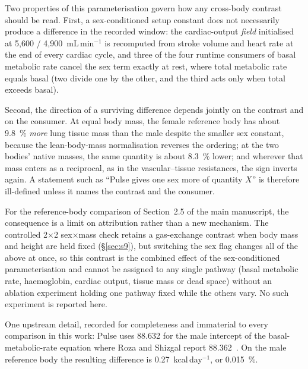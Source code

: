 \documentclass[pdflatex,sn-nature]{sn-jnl}%
\newcommand{\mainref}[2]{#2}
\begin{document}
Two properties of this parameterisation govern how any cross-body contrast should be read. First, a sex-conditioned setup constant does not necessarily produce a difference in the recorded window: the cardiac-output \emph{field} initialised at 5{,}600 / 4{,}900~mL\,min$^{-1}$ is recomputed from stroke volume and heart rate at the end of every cardiac cycle, and three of the four runtime consumers of basal metabolic rate cancel the sex term exactly at rest, where total metabolic rate equals basal (two divide one by the other, and the third acts only when total exceeds basal).

Second, the direction of a surviving difference depends jointly on the contrast and on the consumer. At equal body mass, the female reference body has about 9.8~\% \emph{more} lung tissue mass than the male despite the smaller sex constant, because the lean-body-mass normalisation reverses the ordering; at the two bodies' native masses, the same quantity is about 8.3~\% lower; and wherever that mass enters as a reciprocal, as in the vascular--tissue resistances, the sign inverts again. A statement such as ``Pulse gives one sex more of quantity $X$'' is therefore ill-defined unless it names the contrast and the consumer.

For the reference-body comparison of Section~\mainref{sec:results-sex}{2.5} of the main manuscript, the consequence is a limit on attribution rather than a new mechanism. The controlled 2$\times$2 sex$\times$mass check retains a gas-exchange contrast when body mass and height are held fixed (\S\ref{sec:s9}), but switching the sex flag changes all of the above at once, so this contrast is the combined effect of the sex-conditioned parameterisation and cannot be assigned to any single pathway (basal metabolic rate, haemoglobin, cardiac output, tissue mass or dead space) without an ablation experiment holding one pathway fixed while the others vary. No such experiment is reported here.

One upstream detail, recorded for completeness and immaterial to every comparison in this work: Pulse uses 88.632 for the male intercept of the basal-metabolic-rate equation where Roza and Shizgal report 88.362~\cite{roza1984metabolic}. On the male reference body the resulting difference is 0.27~kcal\,day$^{-1}$, or 0.015~\%.



\end{document}
